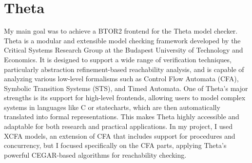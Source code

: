 \section{Theta}
My main goal was to achieve a BTOR2 frontend for the Theta model checker.\cite{theta}
Theta is a modular and extensible model checking framework developed by the Critical Systems Research Group at the Budapest University of Technology and Economics. It is designed to support a wide range of verification techniques, particularly abstraction refinement-based reachability analysis, and is capable of analyzing various low-level formalisms such as Control Flow Automata (CFA), Symbolic Transition Systems (STS), and Timed Automata.
One of Theta's major strengths is its support for high-level frontends, allowing users to model complex systems in languages like C or statecharts, which are then automatically translated into formal representations. This makes Theta highly accessible and adaptable for both research and practical applications.
In my project, I used XCFA models, an extension of CFA that includes support for procedures and concurrency, but I focused specifically on the CFA parts, applying Theta's powerful CEGAR-based algorithms for reachability checking.